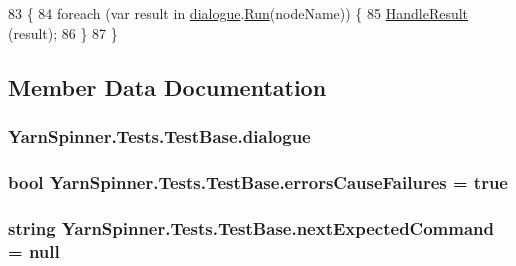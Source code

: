 \begin{DoxyCode}
83                                                                       \{
84             \textcolor{keywordflow}{foreach} (var result \textcolor{keywordflow}{in} \hyperlink{a00146_a4cff5de56c4b8a91c76b6eb2d622a795}{dialogue}.\hyperlink{a00072_aead84ee50cb113ca45724894290ce9c2}{Run}(nodeName)) \{
85                 \hyperlink{a00146_a7b525f85a26d7c942e1cbfa5d6453893}{HandleResult} (result);
86             \}
87         \}
\end{DoxyCode}


\subsection{Member Data Documentation}
\hypertarget{a00146_a4cff5de56c4b8a91c76b6eb2d622a795}{
\subsubsection[{dialogue}]{ Yarn\-Spinner.\-Tests.\-Test\-Base.\-dialogue\hspace{0.3cm}{\ttfamily [protected]}}}\label{a00146_a4cff5de56c4b8a91c76b6eb2d622a795}
\hypertarget{a00146_ac978fe85db843c51411f5517bdbe0eb8}{
\subsubsection[{errors\-Cause\-Failures}]{\setlength{\rightskip}{0pt plus 5cm}bool Yarn\-Spinner.\-Tests.\-Test\-Base.\-errors\-Cause\-Failures = true\hspace{0.3cm}{\ttfamily [protected]}}}\label{a00146_ac978fe85db843c51411f5517bdbe0eb8}
\hypertarget{a00146_a26fae5694fc06c3cdb12d3108dbc34de}{
\subsubsection[{next\-Expected\-Command}]{\setlength{\rightskip}{0pt plus 5cm}string Yarn\-Spinner.\-Tests.\-Test\-Base.\-next\-Expected\-Command = null\hspace{0.3cm}{\ttfamily [private]}}}\label{a00146_a26fae5694fc06c3cdb12d3108dbc34de}
